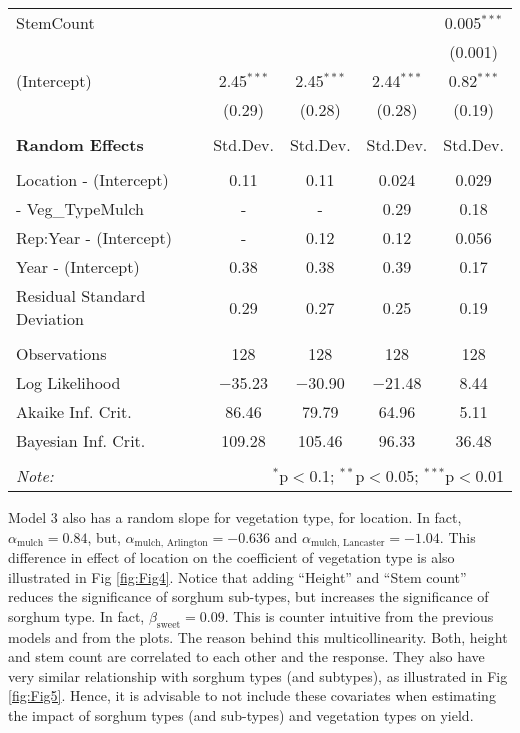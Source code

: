 \begin{table}[H]
\begin{tabular}{@{\extracolsep{5pt}}lccc|c}
 StemCount &  &  &  & 0.005$^{***}$ \\ 
  &  &  &  & (0.001) \\ 
 (Intercept) & 2.45$^{***}$ & 2.45$^{***}$ & 2.44$^{***}$ & 0.82$^{***}$ \\ 
  & (0.29) & (0.28) & (0.28) & (0.19) \\ 
\hline\\[-1.8ex]
{\bf Random Effects} & Std.Dev. & Std.Dev. & Std.Dev. & Std.Dev.\\
\hline\\[-1.8ex]
Location - (Intercept) & 0.11 & 0.11 & 0.024 & 0.029\\
\hphantom{Location} - Veg\_TypeMulch &  -  &  -  & 0.29 & 0.18\\
Rep:Year - (Intercept) &  -  & 0.12 & 0.12 & 0.056\\
Year - (Intercept) & 0.38 & 0.38 & 0.39 & 0.17\\
Residual Standard Deviation & 0.29 & 0.27 & 0.25 & 0.19\\
\hline \\[-1.8ex] 
Observations & 128 & 128 & 128 & 128 \\ 
Log Likelihood & $-$35.23 & $-$30.90 & $-$21.48 & 8.44 \\ 
Akaike Inf. Crit. & 86.46 & 79.79 & 64.96 & 5.11 \\ 
Bayesian Inf. Crit. & 109.28 & 105.46 & 96.33 & 36.48 \\ 
\hline 
\hline \\[-1.8ex] 
\textit{Note:}  & \multicolumn{4}{r}{$^{*}$p$<$0.1; $^{**}$p$<$0.05; $^{***}$p$<$0.01} \\ 
\end{tabular} 
\end{table} 

Model 3 also has a random slope for vegetation type, for location. In fact, $\alpha_{\text{mulch}} = 0.84$, but, $\alpha_{\text{mulch, Arlington}} = -0.636$ and $\alpha_{\text{mulch, Lancaster}} = -1.04$. This difference in effect of location on the coefficient of vegetation type is also illustrated in Fig \ref{fig:Fig4}. Notice that adding ``Height'' and ``Stem count'' reduces the significance of sorghum sub-types, but increases the significance of sorghum type. In fact, $\beta_{\text{sweet}} = 0.09$. This is counter intuitive from the previous models and from the plots. The reason behind this multicollinearity. Both, height and stem count are correlated to each other and the response. They also have very similar relationship with sorghum types (and subtypes), as illustrated in Fig \ref{fig:Fig5}. Hence, it is advisable to not include these covariates when estimating the impact of sorghum types (and sub-types) and vegetation types on yield.


